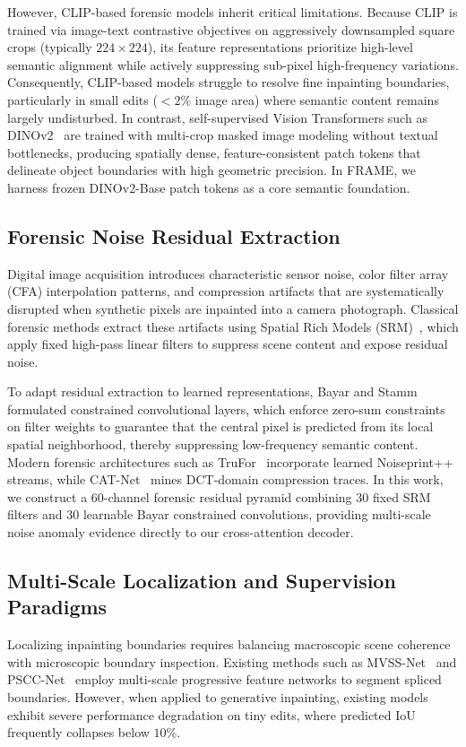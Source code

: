 However, CLIP-based forensic models inherit critical limitations. Because CLIP is trained via image-text contrastive objectives on aggressively downsampled square crops (typically $224 \times 224$), its feature representations prioritize high-level semantic alignment while actively suppressing sub-pixel high-frequency variations. Consequently, CLIP-based models struggle to resolve fine inpainting boundaries, particularly in small edits ($<2\%$ image area) where semantic content remains largely undisturbed. In contrast, self-supervised Vision Transformers such as DINOv2~\cite{dinov2} are trained with multi-crop masked image modeling without textual bottlenecks, producing spatially dense, feature-consistent patch tokens that delineate object boundaries with high geometric precision. In FRAME, we harness frozen DINOv2-Base patch tokens as a core semantic foundation.

\subsection{Forensic Noise Residual Extraction}
Digital image acquisition introduces characteristic sensor noise, color filter array (CFA) interpolation patterns, and compression artifacts that are systematically disrupted when synthetic pixels are inpainted into a camera photograph. Classical forensic methods extract these artifacts using Spatial Rich Models (SRM)~\cite{srm}, which apply fixed high-pass linear filters to suppress scene content and expose residual noise. 

To adapt residual extraction to learned representations, Bayar and Stamm~\cite{bayar} formulated constrained convolutional layers, which enforce zero-sum constraints on filter weights to guarantee that the central pixel is predicted from its local spatial neighborhood, thereby suppressing low-frequency semantic content. Modern forensic architectures such as TruFor~\cite{trufor} incorporate learned Noiseprint++ streams, while CAT-Net~\cite{catnet} mines DCT-domain compression traces. In this work, we construct a 60-channel forensic residual pyramid combining 30 fixed SRM filters and 30 learnable Bayar constrained convolutions, providing multi-scale noise anomaly evidence directly to our cross-attention decoder.

\subsection{Multi-Scale Localization and Supervision Paradigms}
Localizing inpainting boundaries requires balancing macroscopic scene coherence with microscopic boundary inspection. Existing methods such as MVSS-Net~\cite{mvss} and PSCC-Net~\cite{pscc} employ multi-scale progressive feature networks to segment spliced boundaries. However, when applied to generative inpainting, existing models exhibit severe performance degradation on tiny edits, where predicted IoU frequently collapses below $10\%$. 

